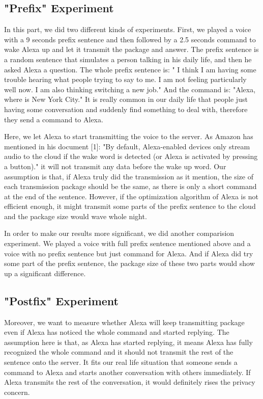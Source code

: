 \subsection{"Prefix" Experiment}

In this part, we did two different kinds of experiments. First, we played a voice with a 9 seconds prefix sentence and then followed by a 2.5 seconds command to wake Alexa up and let it transmit the package and answer. The prefix sentence is a random sentence that simulates a person talking in his daily life, and then he asked Alexa a question. The whole prefix sentence is: " I think I am having some trouble hearing what people trying to say to me. I am not feeling particularly well now. I am also thinking switching a new job." And the command is: "Alexa, where is New York City." It is really common in our daily life that people just having some conversation and suddenly find something to deal with, therefore they send a command to Alexa.

Here, we let Alexa to start transmitting the voice to the server. As Amazon has mentioned in his document [1]: "By default, Alexa-enabled devices only stream audio to the cloud if the wake word is detected (or Alexa is activated by pressing a button)." it will not transmit any data before the wake up word. Our assumption is that, if Alexa truly did the transmission as it mention, the size of each transmission package should be the same, as there is only a short command at the end of the sentence. However, if the optimization algorithm of Alexa is not efficient enough, it might transmit some parts of the prefix sentence to the cloud and the package size would wave whole night.

In order to make our results more significant, we did another comparision experiment. We played a voice with full prefix sentence mentioned above and a voice with no prefix sentence but just command for Alexa. And if Alexa did try some part of the prefix sentence, the package size of these two parts would show up a significant difference.

\subsection{"Postfix" Experiment}
  
Moreover, we want to measure whether Alexa will keep transmitting package even if Alexa has noticed the whole command and started replying. The assumption here is that, as Alexa has started replying, it means Alexa has fully recognized the whole command and it should not transmit the rest of the sentence onto the server. It fits our real life situation that someone sends a command to Alexa and starts another conversation with others immediately. If Alexa transmits the rest of the conversation, it would definitely rises the privacy concern.

